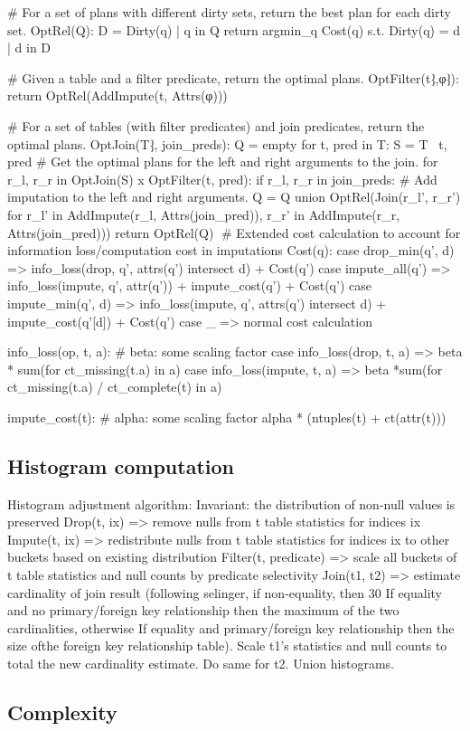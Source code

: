 # For a set of plans with different dirty sets, return the best plan for each dirty set.
OptRel(Q):
	D = {Dirty(q) | q in Q}
	return { argmin_q Cost(q) s.t. Dirty(q) = d | d in D}

# Given a table and a filter predicate, return the optimal plans.
OptFilter(t⁆,φ⁆):
	return OptRel(AddImpute(t, Attrs(φ)))
		
# For a set of tables (with filter predicates) and join predicates, return the optimal plans.
OptJoin(T⁆, join_preds):
	Q = empty
	for t, pred in T:
		S = T \ {t, pred}
		# Get the optimal plans for the left and right arguments to the join.
		for r_l, r_r in OptJoin(S) x OptFilter(t, pred):
			if r_l, r_r in join_preds:
				# Add imputation to the left and right arguments.
				Q = Q union OptRel(Join(r_l', r_r') for r_l' in AddImpute(r_l, Attrs(join_pred)), r_r' in AddImpute(r_r, Attrs(join_pred)))
	return OptRel(Q)
# Extended cost calculation to account for information loss/computation cost in imputations
Cost(q):
  case drop_min(q', d) =>  info_loss(drop, q', attrs(q') intersect d) + Cost(q')
  case impute_all(q') => info_loss(impute, q', attr(q')) + impute_cost(q') + Cost(q')
  case impute_min(q', d) => info_loss(impute, q', attrs(q') intersect d) + impute_cost(q'[d]) + Cost(q')
  case _ => normal cost calculation

  
info_loss(op, t, a):
    # beta: some scaling factor
    case info_loss(drop, t, a) => beta * sum(for ct_missing(t.a) in a)
    case info_loss(impute, t, a) => beta *sum(for ct_missing(t.a) / ct_complete(t) in a)

impute_cost(t):
  # alpha: some scaling factor
  alpha * (ntuples(t) + ct(attr(t)))

\subsection{Histogram computation}
Histogram adjustment algorithm:
Invariant: the distribution of non-null values is preserved
Drop(t, ix) => remove nulls from t table statistics for indices ix
Impute(t, ix) => redistribute nulls from t table statistics for indices ix to other buckets based on existing distribution
Filter(t, predicate) => scale all buckets of t table statistics and null counts by predicate selectivity
Join(t1, t2) => estimate cardinality of join result (following selinger, if non-equality, then 30%
If equality and no primary/foreign key relationship then the maximum of the two cardinalities, otherwise
If equality and primary/foreign key relationship then the size ofthe foreign key relationship table). Scale t1's statistics and null counts to total the new cardinality estimate. Do same for t2. Union histograms.

\subsection{Complexity}

